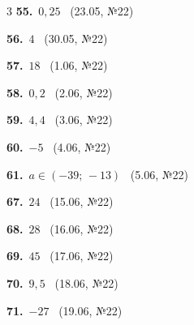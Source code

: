 \documentclass[12pt]{article}
\begin{document}
\begin{samepage}
\nmtAnswerBox
\par{}
\end{samepage}

\ifshowsolutions
{}
\begin{multicols}{3}\noindent
\noindent\textbf{55.}~$0{,}25$ \ {\scriptsize\color{gray}(23.05, №22)}\par
\noindent\textbf{56.}~$4$ \ {\scriptsize\color{gray}(30.05, №22)}\par
\noindent\textbf{57.}~$18$ \ {\scriptsize\color{gray}(1.06, №22)}\par
\noindent\textbf{58.}~$0{,}2$ \ {\scriptsize\color{gray}(2.06, №22)}\par
\noindent\textbf{59.}~$4{,}4$ \ {\scriptsize\color{gray}(3.06, №22)}\par
\noindent\textbf{60.}~$-5$ \ {\scriptsize\color{gray}(4.06, №22)}\par
\noindent\textbf{61.}~$a\in(-39;\,-13)$ \ {\scriptsize\color{gray}(5.06, №22)}\par
\noindent\textbf{67.}~$24$ \ {\scriptsize\color{gray}(15.06, №22)}\par
\noindent\textbf{68.}~$28$ \ {\scriptsize\color{gray}(16.06, №22)}\par
\noindent\textbf{69.}~$45$ \ {\scriptsize\color{gray}(17.06, №22)}\par
\noindent\textbf{70.}~$9{,}5$ \ {\scriptsize\color{gray}(18.06, №22)}\par
\noindent\textbf{71.}~$-27$ \ {\scriptsize\color{gray}(19.06, №22)}\par
\end{multicols}
\fi

\endgroup
\end{document}
